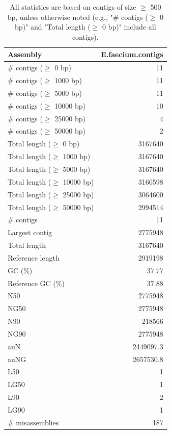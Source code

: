 \documentclass[12pt,a4paper]{article}
\begin{document}
\begin{table}[ht]
\begin{center}
\caption{All statistics are based on contigs of size $\geq$ 500 bp, unless otherwise noted (e.g., "\# contigs ($\geq$ 0 bp)" and "Total length ($\geq$ 0 bp)" include all contigs).}
\begin{tabular}{|l*{1}{|r}|}
\hline
Assembly & E.faecium.contigs \\ \hline
\# contigs ($\geq$ 0 bp) & 11 \\ \hline
\# contigs ($\geq$ 1000 bp) & 11 \\ \hline
\# contigs ($\geq$ 5000 bp) & 11 \\ \hline
\# contigs ($\geq$ 10000 bp) & 10 \\ \hline
\# contigs ($\geq$ 25000 bp) & 4 \\ \hline
\# contigs ($\geq$ 50000 bp) & 2 \\ \hline
Total length ($\geq$ 0 bp) & 3167640 \\ \hline
Total length ($\geq$ 1000 bp) & 3167640 \\ \hline
Total length ($\geq$ 5000 bp) & 3167640 \\ \hline
Total length ($\geq$ 10000 bp) & 3160598 \\ \hline
Total length ($\geq$ 25000 bp) & 3064600 \\ \hline
Total length ($\geq$ 50000 bp) & 2994514 \\ \hline
\# contigs & 11 \\ \hline
Largest contig & 2775948 \\ \hline
Total length & 3167640 \\ \hline
Reference length & 2919198 \\ \hline
GC (\%) & 37.77 \\ \hline
Reference GC (\%) & 37.88 \\ \hline
N50 & 2775948 \\ \hline
NG50 & 2775948 \\ \hline
N90 & 218566 \\ \hline
NG90 & 2775948 \\ \hline
auN & 2449097.3 \\ \hline
auNG & 2657530.8 \\ \hline
L50 & 1 \\ \hline
LG50 & 1 \\ \hline
L90 & 2 \\ \hline
LG90 & 1 \\ \hline
\# misassemblies & 187 \\ \hline

\end{tabular}
\end{center}
\end{table}
\end{document}
